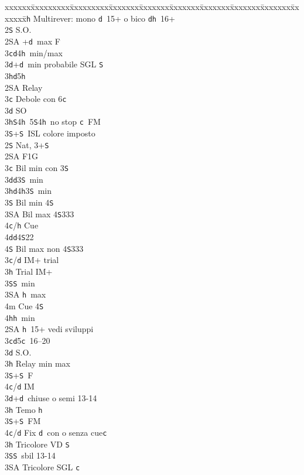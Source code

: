\documentclass[a4paper,italian]{article}
\newcommand{\BS}{\small{\texttt{S}}}
\newcommand{\BC}{\small{\texttt{c}}}
\newcommand{\BD}{\small{\texttt{d}}}
\newcommand{\BH}{\small{\texttt{h}}}
\newenvironment{bidtable}
{\begin{tabbing}

    xxxxxx\=xxxxxxxxx\=xxxxxxxxx\=xxxxxxx\=xxxxxxx\=xxxxxxx\=xxxxxxx\=xxxxxxx\=xxxxxxx\=xxxxxxx\=\kill}
{\end{tabbing} }%
\begin{document}
\begin{multicols}{2}
\begin{bidtable}
        2\BH \> Multirever: mono \BD\ 15+ o bico \BD \BH\ 16+\+\\
        2\BS \> S.O.\+\\
        2\small{SA} +\BD\ max F\\
        3\BC {}\BD4\BH\ min/max\\
        3\BD {}+\BD\ min probabile SGL \BS \\
        3\BH {}\BD5\BH\-\\
        2\small{SA} \> Relay \\
        3\BC \> Debole con 6\BC \\
        3\BD \> SO\\
        3\BH {}\BS 4\BH\ 5\BS 4\BH\ no stop \BC\ FM\\
        3\BS {}+\BS\ ISL colore imposto\-\\
        2\BS \> Nat, 3+\BS \+\\
        2\small{SA} \> F1G\+\\
        3\BC \> Bil min con 3\BS \\
        3\BD {}\BD 3\BS\ min\\
        3\BH {}\BD 4\BH 3\BS\ min\\
        3\BS \> Bil min 4\BS \\
        3\small{SA} \> Bil max 4\BS 333\\
        4\BC/\BH \> Cue\\
        4\BD {}\BD 4\BS 22\\
        4\BS \> Bil max non 4\BS 333\-\\
        3\BC/\BD \> IM+ trial\\
        3\BH \> Trial IM+\+\\
        3\BS {}\BS\ min\\
        3\small{SA} \BH\ max\\
        4m \> Cue 4\BS \\
        4\BH {}\BH\ min\-\-\\
        2\small{SA} \BH\ 15+ vedi sviluppi\\
        3\BC {}\BD 5\BC\ 16--20\+\\
        3\BD \> S.O.\\
        3\BH \> Relay min max\\
        3\BS {}+\BS\ F\\
        4\BC/\BD \> IM\-\\
        3\BD {}+\BD\ chiuse o semi 13-14\+\\
        3\BH \> Temo \BH \\
        3\BS {}+\BS\ FM\\
        4\BC/\BD \> Fix \BD\ con o senza cue\BC \-\\
        3\BH \> Tricolore VD \BS \\
        3\BS {}\BS\ sbil 13-14\\
        3\small{SA} \> Tricolore SGL \BC \-
    \end{bidtable}


\end{multicols}
\end{document}

